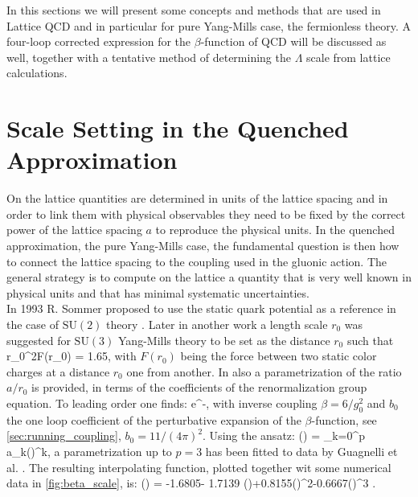In this sections we will present some concepts and methods that are used in Lattice QCD and in particular for pure Yang-Mills case, the fermionless theory. A four-loop corrected expression for the $\beta$-function of QCD will be discussed as well, together with a tentative method of determining the $\Lambda$ scale from lattice calculations.

\section{Scale Setting in the Quenched Approximation}
On the lattice quantities are determined in units of the lattice spacing and in order to link them with physical observables they need to be fixed by the correct power of the lattice spacing $a$ to reproduce the physical units. In the quenched approximation, the pure Yang-Mills case, the fundamental question is then how to connect the lattice spacing to the coupling used in the gluonic action. The general strategy is to compute on the lattice a quantity that is very well known in physical units and that has minimal systematic uncertainties.\\ 
In 1993 R. Sommer proposed to use the static quark potential as a reference in the case of $\mathrm{SU}(2)$ theory \cite{sommer_new_1994}. Later in another work \cite{guagnelli_precision_1998} a length scale $r_0$ was suggested for $\mathrm{SU}(3)$ Yang-Mills theory to be set as the distance $r_0$ such that 
\beq
r_0^2F(r_0) = 1.65,
\eeq 
with $F(r_0)$ being the force between two static color charges at a distance $r_0$ one from another. In \cite{guagnelli_precision_1998} also a parametrization of the ratio $a/r_0$ is provided, in terms of the coefficients of the renormalization group equation. To leading order one finds:
\beq
     \propto e^{-},
\eeq
with inverse coupling $\beta = 6/g_0^2$ and $b_0$ the one loop coefficient of the perturbative expansion of the $\beta$-function, see \cref{sec:running_coupling}, $b_0=11/(4\pi)^2$. Using the ansatz:
\beq
    \ln\left(\right) = \sum_{k=0}^p a_k()^k,
\eeq
a parametrization up to $p=3$ has been fitted to data by Guagnelli et al. \cite{guagnelli_precision_1998}. The resulting interpolating function, plotted together wit some numerical data in \cref{fig:beta_scale}, is:
\beq
    \ln\left(\right) = -1.6805- 1.7139 ()+0.8155()^2-0.6667()^3
    \label{scale:parameter}.
\eeq

 
